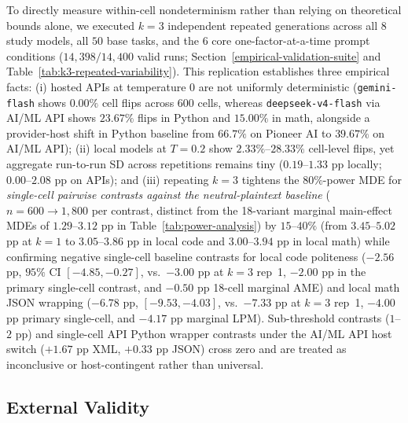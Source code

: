 \documentclass[a4paper,fleqn]{cas-sc}
\begin{document}
To directly measure within-cell nondeterminism rather than relying on theoretical bounds alone, we executed $k = 3$ independent repeated generations across all $8$ study models, all $50$ base tasks, and the $6$ core one-factor-at-a-time prompt conditions ($14{,}398 / 14{,}400$ valid runs; Section~\ref{empirical-validation-suite} and Table~\ref{tab:k3-repeated-variability}). This replication establishes three empirical facts: (i) hosted APIs at temperature $0$ are not uniformly deterministic (\texttt{gemini-flash} shows $0.00\%$ cell flips across $600$ cells, whereas \texttt{deepseek-v4-flash} via AI/ML API shows $23.67\%$ flips in Python and $15.00\%$ in math, alongside a provider-host shift in Python baseline from $66.7\%$ on Pioneer AI to $39.67\%$ on AI/ML API); (ii) local models at $T = 0.2$ show $2.33\%$--$28.33\%$ cell-level flips, yet aggregate run-to-run SD across repetitions remains tiny ($0.19$--$1.33$ pp locally; $0.00$--$2.08$ pp on APIs); and (iii) repeating $k = 3$ tightens the $80\%$-power MDE for \emph{single-cell pairwise contrasts against the neutral-plaintext baseline} ($n = 600 \to 1{,}800$ per contrast, distinct from the 18-variant marginal main-effect MDEs of $1.29$--$3.12$ pp in Table~\ref{tab:power-analysis}) by $15$--$40\%$ (from $3.45$--$5.02$ pp at $k = 1$ to $3.05$--$3.86$ pp in local code and $3.00$--$3.94$ pp in local math) while confirming negative single-cell baseline contrasts for local code politeness ($-2.56$ pp, $95\%$ CI $[-4.85, -0.27]$, vs.\ $-3.00$ pp at $k = 3$ rep~1, $-2.00$ pp in the primary single-cell contrast, and $-0.50$ pp 18-cell marginal AME) and local math JSON wrapping ($-6.78$ pp, $[-9.53, -4.03]$, vs.\ $-7.33$ pp at $k = 3$ rep~1, $-4.00$ pp primary single-cell, and $-4.17$ pp marginal LPM). Sub-threshold contrasts ($1$--$2$ pp) and single-cell API Python wrapper contrasts under the AI/ML API host switch ($+1.67$ pp XML, $+0.33$ pp JSON) cross zero and are treated as inconclusive or host-contingent rather than universal.

\subsection{External Validity}\label{external-validity}
\end{document}
